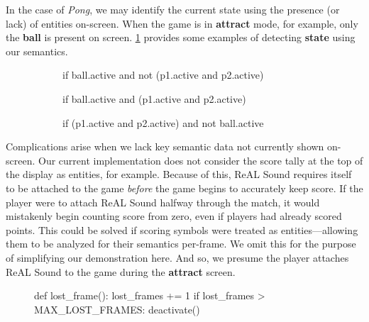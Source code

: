 \documentclass{report}
\newcommand{\rs}{ReAL Sound\xspace}
\newcommand{\state}[1]{\textbf{#1}}
\newcommand{\ball}{\textbf{ball}\xspace}
\begin{document}
In the case of \emph{Pong}, we may identify the current state using the presence (or lack) of entities on-screen. When the game is in \state{attract} mode, for example, only the \ball is present on screen. \cref{code:decSem} provides some examples of detecting \state{state} using our semantics.


\begin{figure}[ht]

    \centering
    \begin{subfigure}{\textwidth}
        \begin{codeblock}
if ball.active and not (p1.active and p2.active) 
\end{codeblock}
        \subcaption{\state{Attract}}
    \end{subfigure}

    \begin{subfigure}{\textwidth}
        \begin{codeblock}
if ball.active and (p1.active and p2.active)
\end{codeblock}
        \subcaption{\state{Match}}
    \end{subfigure}

    \begin{subfigure}{\textwidth}
        \begin{codeblock}
if (p1.active and p2.active) and not ball.active
\end{codeblock}
        \subcaption{\state{Pause}}
    \end{subfigure}
    \label{code:decSem}
\end{figure}

Complications arise when we lack key semantic data not currently shown on-screen. Our current implementation does not consider the score tally at the top of the display as entities, for example. Because of this, \rs requires itself to be attached to the game \emph{before} the game begins to accurately keep score. If the player were to attach \rs halfway through the match, it would mistakenly begin counting score from zero, even if players had already scored points. This could be solved if scoring symbols were treated as entities---allowing them to be analyzed for their semantics per-frame. We omit this for the purpose of simplifying our demonstration here. And so, we presume the player attaches \rs to the game during the \state{attract} screen. 

\begin{figure}
    \begin{codeblock}
def lost_frame():
    lost_frames += 1
    if lost_frames > MAX_LOST_FRAMES:
        deactivate()
\end{codeblock}
    \label{code:objPers}
\end{figure}
\end{document}
